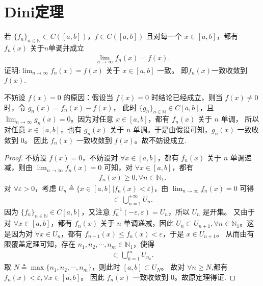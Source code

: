 \documentclass[../../main.tex]{subfiles}%
\begin{document}
\section{Dini定理}

\begin{theorem}[Dini定理]\label{theorem:Dini定理(数分版本)}
若 \(\{f_n\}_{n\in\mathbb{N}}\subset C([a,b])\)，\(f\in C([a,b])\) 且对每一个 \(x\in [a,b]\)，都有 \(f_n(x)\) 关于$n$单调并成立
\begin{align*}
\lim_{n\rightarrow\infty}f_n(x)=f(x).
\end{align*}
证明:\(\lim_{n\rightarrow\infty}f_n(x)=f(x)\) 关于 \(x\in [a,b]\) 一致。 即$f_n(x)$一致收敛到$f(x).$
\end{theorem}
\begin{remark}
不妨设 \(f(x) = 0\) 的原因：假设当 \(f(x) = 0\) 时结论已经成立，则当 \(f(x)\ne 0\) 时，令 \(g_n(x)=f_n(x)-f(x)\)，
此时 \(\{g_n\}_{n\in \mathbb{N}}\in C[a,b]\)，且 \(\lim_{n\rightarrow \infty}g_n(x)=0\)。因为对任意 \(x\in [a,b]\)，都有 \(f_n(x)\) 关于 \(n\) 单调，
所以对任意 \(x\in [a,b]\)，也有 \(g_n(x)\) 关于 \(n\) 单调。于是由假设可知，\(g_n(x)\) 一致收敛到 \(0\)。
因此 \(f_n(x)\) 一致收敛到 \(f(x)\)。故不妨设成立.
\end{remark}
\begin{proof}

不妨设 \(f(x) = 0\)，不妨设对 \(\forall x\in [a,b]\)，都有 \(f_n(x)\) 关于 \(n\) 单调递减，则由 \(\lim_{n\rightarrow \infty}f_n(x)=0\) 可知，对 \(\forall x\in [a,b]\)，都有
\begin{align*}
f_n(x)\geqslant 0,\forall n\in \mathbb{N}_1.
\end{align*}
对 \(\forall \varepsilon>0\)，考虑 \(U_n\triangleq \{x\in [a,b]|f_n(x)<\varepsilon\}\)，由 \(\lim_{n\rightarrow \infty}f_n(x)=0\) 可得
\begin{align*}
[a,b]\subset \bigcup_{n = 1}^{+\infty}U_n.
\end{align*}
因为 \(\{f_n\}_{n\in \mathbb{N}}\in C[a,b]\)，又注意 \(f_{n}^{-1}(-\varepsilon,\varepsilon)=U_n\)，所以 \(U_n\) 是开集。
又由于对 \(\forall x\in [a,b]\)，都有 \(f_n(x)\) 关于 \(n\) 单调递减，因此 \(U_n\subset U_{n + 1},\forall n\in \mathbb{N}_1\)。这是因为对 \(\forall x\in U_n\)，都有 \(f_{n + 1}(x)\leqslant f_n(x)<\varepsilon\)，于是 \(x\in U_{n + 1}\)。
从而由有限覆盖定理可知，存在 \(n_1,n_2,\cdots,n_m\in \mathbb{N}_1\)，使得
\begin{align*}
[a,b]\subset \bigcup_{k = 1}^mU_{n_k}.
\end{align*}
取 \(N\triangleq \max\{n_1,n_2,\cdots,n_m\}\)，则此时 \([a,b]\subset U_N\)。
故对 \(\forall n\geqslant N\),都有 \(f_n(x)<\varepsilon,\forall x\in [a,b]\)。
因此 \(f_n(x)\) 一致收敛到 $0$。故原定理得证. 

\end{proof}
\end{document}
